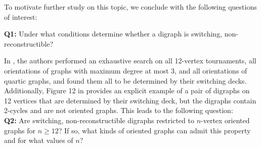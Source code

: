 \documentclass[11pt]{article}
\theoremstyle{definition}
\numberwithin{equation}{section}
\begin{document}
\begin{humanblock}
To motivate further study on this topic, we conclude with the following questions of interest:

\textbf{Q1:} Under what conditions determine whether a digraph is switching, non-reconstructible?

In \cite{McKaySchweitzer2014}, the authors performed an exhaustive search on all 12-vertex tournaments, all orientations of graphs with maximum degree at most 3, and all orientations of quartic graphs, and found them all to be determined by their switching decks. Additionally, Figure 12 in \cite{McKaySchweitzer2014} provides an explicit example of a pair of digraphs on 12 vertices that are determined by their switching deck, but the digraphs contain 2-cycles and are not oriented graphs. This leads to the following question: \\

\textbf{Q2:} Are switching, non-reconstructible digraphs restricted to $n$-vertex oriented graphs for $n \geq 12$? If so, what kinds of oriented graphs can admit this property and for what values of $n$?
\end{humanblock}




\end{document}
